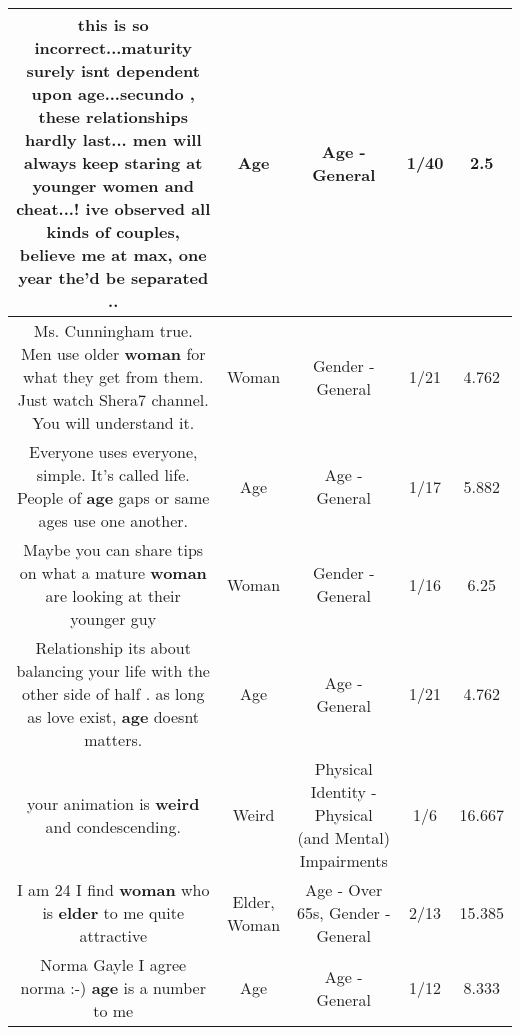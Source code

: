 \documentclass[11pt]{article}
\newlength\mylength
\begin{document}
\begin{center}
\begin{longtable}{|C{.65\mylength}|C{.30\mylength}|C{.12\mylength}|C{.12\mylength}|C{.12\mylength}|}
  \small this is so incorrect...maturity surely isnt dependent upon \textbf{age}...secundo , these relationships hardly last... men will always keep staring at younger women and cheat...!  ive observed all kinds of couples, believe me at max, one year the'd be separated ..\normalsize   & Age & Age - General & 1/40 & 2.5 \\  \hline
  \small Ms. Cunningham true. Men use older \textbf{woman} for what they get from them. Just watch Shera7 channel. You will understand it.\normalsize   & Woman & Gender - General & 1/21 & 4.762 \\  \hline
  \small Everyone uses everyone, simple. It's called life. People of \textbf{age} gaps or same ages use one another.\normalsize   & Age & Age - General & 1/17 & 5.882 \\  \hline
  \small Maybe you can share tips on what a mature \textbf{woman} are looking at their younger guy\normalsize   & Woman & Gender - General & 1/16 & 6.25 \\  \hline
  \small Relationship its about balancing your life with the other side of half . as long as love exist, \textbf{age} doesnt matters.\normalsize   & Age & Age - General & 1/21 & 4.762 \\  \hline
  \small your animation is \textbf{weird} and condescending.\normalsize   & Weird & Physical Identity - Physical (and Mental) Impairments & 1/6 & 16.667 \\  \hline
  \small I am 24  I find \textbf{woman} who is \textbf{elder} to me quite attractive\normalsize   & Elder, Woman & Age - Over 65s, Gender - General & 2/13 & 15.385 \\  \hline
  \small Norma Gayle I agree norma :-) \textbf{age} is a number to me\normalsize   & Age & Age - General & 1/12 & 8.333 \\  \hline

\end{longtable}
\end{center}
\end{document}

